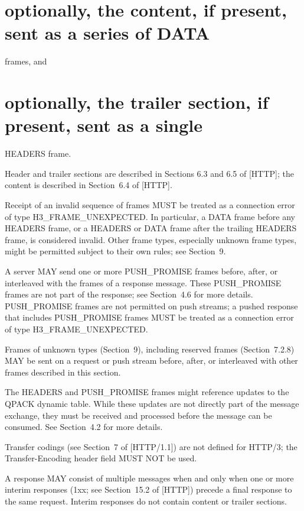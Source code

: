 \documentclass{article}
\begin{document}
\section{optionally, the content, if present, sent as a series of DATA}

frames, and

\section{optionally, the trailer section, if present, sent as a single}

HEADERS frame.

Header and trailer sections are described in Sections 6.3 and 6.5 of [HTTP]; the content is described in Section~6.4 of [HTTP].

Receipt of an invalid sequence of frames MUST be treated as a connection error of type H3\_FRAME\_UNEXPECTED.  In particular, a DATA frame before any HEADERS frame, or a HEADERS or DATA frame after the trailing HEADERS frame, is considered invalid.  Other frame types, especially unknown frame types, might be permitted subject to their own rules; see Section~9.

A server MAY send one or more PUSH\_PROMISE frames before, after, or interleaved with the frames of a response message.  These PUSH\_PROMISE frames are not part of the response; see Section~4.6 for more details.  PUSH\_PROMISE frames are not permitted on push streams; a pushed response that includes PUSH\_PROMISE frames MUST be treated as a connection error of type H3\_FRAME\_UNEXPECTED.

Frames of unknown types (Section~9), including reserved frames (Section~7.2.8) MAY be sent on a request or push stream before, after, or interleaved with other frames described in this section.

The HEADERS and PUSH\_PROMISE frames might reference updates to the QPACK dynamic table.  While these updates are not directly part of the message exchange, they must be received and processed before the message can be consumed.  See Section~4.2 for more details.

Transfer codings (see Section~7 of [HTTP/1.1]) are not defined for HTTP/3; the Transfer-Encoding header field MUST NOT be used.

A response MAY consist of multiple messages when and only when one or more interim responses (1xx; see Section~15.2 of [HTTP]) precede a final response to the same request.  Interim responses do not contain content or trailer sections.
\end{document}

